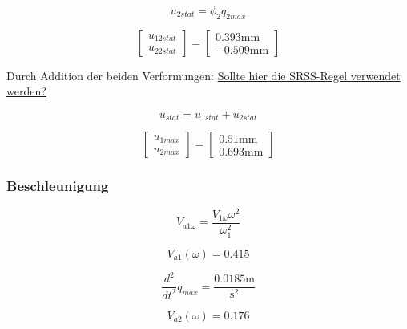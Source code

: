 \documentclass[
  letterpaper,
  DIV=11]{scrreprt}
\begin{document}
\begin{equation}u_{2 stat} = \phi_{2} q_{2 max}\end{equation}

\begin{equation}\left[\begin{matrix}u_{12stat}\\u_{22stat}\end{matrix}\right] = \left[\begin{matrix}0.393 \text{mm}\\- 0.509 \text{mm}\end{matrix}\right]\end{equation}

Durch Addition der beiden Verformungen: \ul{Sollte hier die SRSS-Regel
verwendet werden?}

\begin{equation}u_{stat} = u_{1 stat} + u_{2 stat}\end{equation}

\begin{equation}\left[\begin{matrix}u_{1max}\\u_{2max}\end{matrix}\right] = \left[\begin{matrix}0.51 \text{mm}\\0.693 \text{mm}\end{matrix}\right]\end{equation}

\hypertarget{beschleunigung}{%
\subsubsection{Beschleunigung}\label{beschleunigung}}

\begin{equation}V_{a1 \omega} = \frac{V_{1 \omega} \omega^{2}}{\omega_{1}^{2}}\end{equation}

\begin{equation}V_{a1}{\left(\omega \right)} = 0.415\end{equation}

\begin{equation}\frac{d^{2}}{d t^{2}} q_{max} = \frac{0.0185 \text{m}}{\text{s}^{2}}\end{equation}

\begin{equation}V_{a2}{\left(\omega \right)} = 0.176\end{equation}
\end{document}
